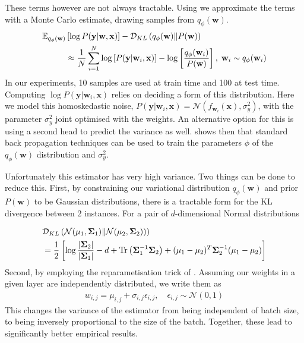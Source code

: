 These terms however are not always tractable. Using \citet{Blundell2015} we approximate the terms with a Monte Carlo estimate, drawing samples from \( q_\phi(\mathbf{w}) \).
\begin{align}
\mathbb{E}_{q_\phi(\mathbf{w})}&\left[ \log P(\mathbf{y} |  \mathbf{w}, \mathbf{x}) \right] - \mathcal{D}_{KL} \left( q_\phi(\mathbf{w}) \| P(\mathbf{w}) \right) \nonumber \\
&\approx \frac{1}{N} \sum_{i=1}^{N} \log \left[ P(\mathbf{y} |  \mathbf{w}_i, \mathbf{x}) \right]  - \log \left[ \frac{q_\phi(\mathbf{w}_i)}{P(\mathbf{w})} \right], \; \mathbf{w}_i \sim q_\phi(\mathbf{w}_i)
\end{align}
In our experiments, 10 samples are used at train time and 100 at test time. Computing \( \log P(\mathbf{y} |  \mathbf{w}_i, \mathbf{x}) \) relies on deciding a form of this distribution. Here we model this homoskedastic noise, \(P(\mathbf{y} |  \mathbf{w}_i, \mathbf{x}) = \mathcal{N}(f_{\mathbf{w}_i}(\mathbf{x}), \sigma_y^2) \), with the parameter \( \sigma_y^2 \) joint optimised with the weights. An alternative option for this is using a second head to predict the variance as well. \citet{Blundell2015} shows then that standard back propagation techniques can be used to train the parameters \( \phi \) of the \( q_\phi(\mathbf{w}) \) distribution and \( \sigma_y^2 \).

Unfortunately this estimator has very high variance. Two things can be done to reduce this. First, by constraining our variational distribution \( q_\phi(\mathbf{w}) \) and prior \( P(\mathbf{w}) \) to be Gaussian distributions, there is a tractable form for the KL divergence between 2 instances. For a pair of \( d \)-dimensional Normal distributions

\begin{align}
	&\mathcal{D}_{KL} \left( \mathcal{N}(\mathbf{\mu}_1, \mathbf{\Sigma}_1) \| \mathcal{N}(\mathbf{\mu}_2, \mathbf{\Sigma}_2) \right)) \nonumber \\
	&= \frac{1}{2} \left[\log \frac{|\mathbf{\Sigma}_2|}{|\mathbf{\Sigma}_1|} - d  + \operatorname{Tr} \left( \mathbf{\Sigma}_1^{-1} \mathbf{\Sigma}_2 \right) + (\mathbf{\mu}_1 - \mathbf{\mu}_2)^T \mathbf{\Sigma}_2^{-1} (\mathbf{\mu}_1 - \mathbf{\mu}_2) \right]
\end{align}
Second, by employing the reparametisation trick of \citet{Kingma2015}. Assuming our weights in a given layer are independently distributed, we write them as
\begin{align}
	w_{i,j} = \mu_{i,j} + \sigma_{i,j} \epsilon_{i,j}, \quad \epsilon_{i,j} \sim \mathcal{N}(0,1)
\end{align}
This changes the variance of the estimator from being independent of batch size, to being inversely proportional to the size of the batch. Together, these lead to significantly better empirical results.

